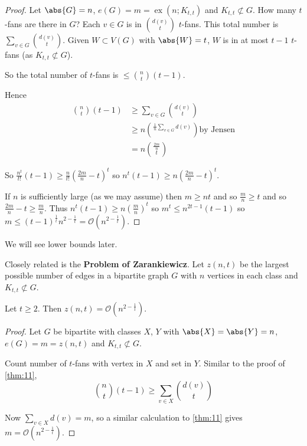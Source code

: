 \documentclass{article}
\DeclareMathOperator{\ext}{ex}
\begin{document}
\begin{proof}
    Let $\abs{G} = n$, $e(G) = m = \ext(n; K_{t, t})$ and $K_{t,t} \not\subset G$. How many $t$-fans are there in $G$? Each $v \in G$ is in $\binom{d(v)}{t}$ $t$-fans. This total number is $\sum_{v \in G} \binom{d(v)}{t}$.
    Given $W \subset V(G)$ with $\abs{W} = t$, $W$ is in at most $t-1$ $t$-fans (as $K_{t, t} \not\subset G$).

    So the total number of $t$-fans is $\leq \binom{n}{t} (t-1)$.

    Hence
    \begin{align*}
        \binom{n}{t} (t-1) &\geq \sum_{v \in G} \binom{d(v)}{t} \\
                           &\geq n \binom{\frac{1}{n} \sum_{v \in G} d(v)} \qquad \text{by Jensen}\\
                           &= n \binom{\frac{2m}{n}}{t}
    \end{align*}

    So $\frac{n^t}{t!} (t-1) \geq \frac{n}{t!} (\frac{2m}{n} - t)^t$ so $n^t (t-1) \geq n (\frac{2m}{n} - t)^t$.

    If $n$ is sufficiently large (as we may assume) then $m \geq n t$ and so $\frac{m}{n} \geq t$ and so $\frac{2m}{n} - t \geq \frac{m}{n}$.
    Thus $n^t (t-1) \geq n (\frac{m}{n})^t$ so $m^t \leq n^{2t-1} (t-1)$ so $m \leq (t-1)^\frac{1}{t} n^{2-\frac{1}{t}} = \mathcal{O}(n^{2-\frac{1}{t}})$.
\end{proof}

We will see lower bounds later.

Closely related is the \textbf{Problem of Zarankiewicz}. Let $z(n, t)$ be the largest possible number of edges in a bipartite graph $G$ with $n$ vertices in each class and $K_{t, t} \not\subset G$.

\begin{nthm}\label{thm:12}
    Let $t \geq 2$. Then $z(n, t)  = \mathcal{O}(n^{2 - \frac{1}{t}})$.
\end{nthm}
\begin{proof}
    Let $G$ be bipartite with classes $X$, $Y$ with $\abs{X} = \abs{Y} = n$, $e(G) = m = z(n, t)$ and $K_{t, t} \not\subset G$.

    Count number of $t$-fans with vertex in $X$ and set in $Y$.
    Similar to the proof of \cref{thm:11},
    \begin{equation*}
        \binom{n}{t} (t-1) \geq \sum_{v \in X} \binom{d(v)}{t}
    \end{equation*}

    Now $\sum_{v \in X} d(v) = m$, so a similar calculation to \cref{thm:11} gives $m = \mathcal{O}(n^{2 - \frac{1}{t}})$.
\end{proof}
\end{document}
